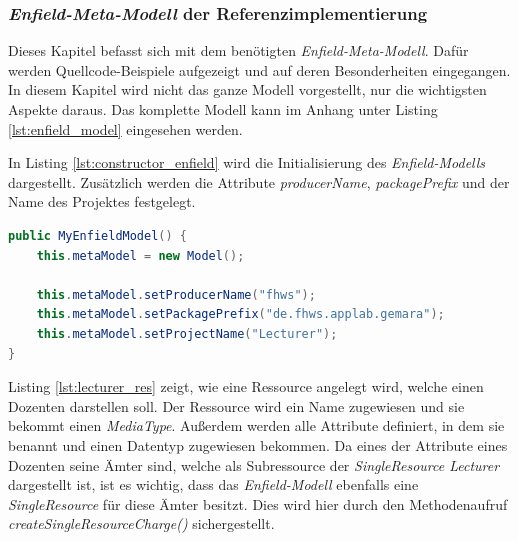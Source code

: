 \subsubsection{\textit{Enfield-Meta-Modell} der Referenzimplementierung} \label{sec:enfield_intro}
Dieses Kapitel befasst sich mit dem benötigten \textit{Enfield-Meta-Modell}. Dafür werden Quellcode-Beispiele aufgezeigt und auf deren Besonderheiten eingegangen. In diesem Kapitel wird nicht das ganze Modell vorgestellt, nur die wichtigsten Aspekte daraus. Das komplette Modell kann im Anhang unter Listing \ref{lst:enfield_model} eingesehen werden.

In Listing \ref{lst:constructor_enfield} wird die Initialisierung des \textit{Enfield-Modells} dargestellt. Zusätzlich werden die Attribute \textit{producerName}, \textit{packagePrefix} und der Name des Projektes festgelegt.

\begin{lstlisting}[label=lst:constructor_enfield,
language=java,
firstnumber=1,
caption=Initialisierung des \textit{Enfield-Meta-Modells}.]	
public MyEnfieldModel() {
	this.metaModel = new Model();

	this.metaModel.setProducerName("fhws");
	this.metaModel.setPackagePrefix("de.fhws.applab.gemara");
	this.metaModel.setProjectName("Lecturer");
}
\end{lstlisting}

Listing \ref{lst:lecturer_res} zeigt, wie eine Ressource angelegt wird, welche einen Dozenten darstellen soll. Der Ressource wird ein Name zugewiesen und sie bekommt einen \textit{MediaType}. Außerdem werden alle Attribute definiert, in dem sie benannt und einen Datentyp zugewiesen bekommen.
 Da eines der Attribute eines Dozenten seine Ämter sind, welche als Subressource der \textit{SingleResource Lecturer} dargestellt ist, ist es wichtig, dass das \textit{Enfield-Modell} ebenfalls eine \textit{SingleResource} für diese Ämter besitzt. Dies wird hier durch den Methodenaufruf \textit{createSingleResourceCharge()} sichergestellt.

\newpage

